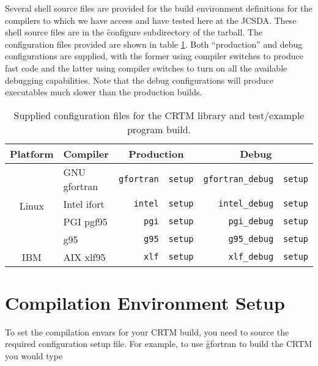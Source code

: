 Several shell source files are provided for the build environment definitions for the compilers to which we have access and have tested here at the JCSDA. These shell source files are in the \f{configure} subdirectory of the tarball. The configuration files provided are shown in table \ref{tab:supplied_configurations}. Both ``production'' and debug configurations are supplied, with the former using compiler switches to produce fast code and the latter using compiler switches to turn on all the available debugging capabilities. Note that the debug configurations will produce executables much slower than the production builds. 
\begin{table}[htp]
  \centering
  \begin{tabular}{clr@{.}lr@{.}l}
    \hline
    \sffamily\textbf{Platform} & \sffamily\textbf{Compiler} & \multicolumn{2}{c}{\sffamily\textbf{Production}} & \multicolumn{2}{c}{\sffamily\textbf{Debug}} \\
    \hline\hline
    \multirow{4}{*}{Linux} & GNU gfortran          & \texttt{gfortran}&\texttt{setup} & \texttt{gfortran\_debug}&\texttt{setup}\\
                           & Intel ifort           & \texttt{intel}&\texttt{setup}    & \texttt{intel\_debug}&\texttt{setup}   \\
                           & PGI pgf95             & \texttt{pgi}&\texttt{setup}      & \texttt{pgi\_debug}&\texttt{setup}     \\
                           & g95                   & \texttt{g95}&\texttt{setup}      & \texttt{g95\_debug}&\texttt{setup}     \\[0.2cm]
    IBM                    & AIX xlf95             & \texttt{xlf}&\texttt{setup}      & \texttt{xlf\_debug}&\texttt{setup}     \\
  \hline
  \end{tabular}
  \caption{Supplied configuration files for the CRTM library and test/example program build.}
  \label{tab:supplied_configurations}
\end{table}


\section{Compilation Environment Setup}
To set the compilation envars for your CRTM build, you need to source the required configuration setup file. For example, to use \f{gfortran} to build the CRTM you would type

